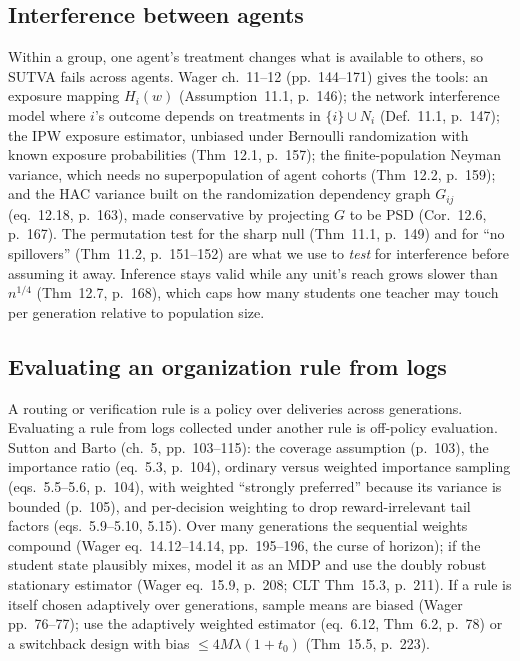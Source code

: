 \documentclass[11pt]{article}
\begin{document}
\subsection{Interference between agents}

Within a group, one agent's treatment changes what is available to others, so SUTVA fails across agents. Wager
ch.~11--12 (pp.~144--171) gives the tools: an exposure mapping $H_i(w)$ (Assumption~11.1, p.~146); the network
interference model where $i$'s outcome depends on treatments in $\{i\}\cup N_i$ (Def.~11.1, p.~147); the IPW exposure
estimator, unbiased under Bernoulli randomization with known exposure probabilities (Thm~12.1, p.~157); the
finite-population Neyman variance, which needs no superpopulation of agent cohorts (Thm~12.2, p.~159); and the
HAC variance built on the randomization dependency graph $G_{ij}$ (eq.~12.18, p.~163), made conservative by
projecting $G$ to be PSD (Cor.~12.6, p.~167). The permutation test for the sharp null (Thm~11.1, p.~149) and for
``no spillovers'' (Thm~11.2, p.~151--152) are what we use to \emph{test} for interference before assuming it away.
Inference stays valid while any unit's reach grows slower than $n^{1/4}$ (Thm~12.7, p.~168), which caps how many
students one teacher may touch per generation relative to population size.

\subsection{Evaluating an organization rule from logs}

A routing or verification rule is a policy over deliveries across generations. Evaluating a rule from logs
collected under another rule is off-policy evaluation. Sutton and Barto (ch.~5, pp.~103--115): the coverage
assumption (p.~103), the importance ratio (eq.~5.3, p.~104), ordinary versus weighted importance sampling
(eqs.~5.5--5.6, p.~104), with weighted ``strongly preferred'' because its variance is bounded (p.~105), and
per-decision weighting to drop reward-irrelevant tail factors (eqs.~5.9--5.10, 5.15). Over many generations the
sequential weights compound (Wager eq.~14.12--14.14, pp.~195--196, the curse of horizon); if the student state
plausibly mixes, model it as an MDP and use the doubly robust stationary estimator (Wager eq.~15.9, p.~208; CLT
Thm~15.3, p.~211). If a rule is itself chosen adaptively over generations, sample means are biased (Wager
pp.~76--77); use the adaptively weighted estimator (eq.~6.12, Thm~6.2, p.~78) or a switchback design with bias
$\le 4M\lambda(1+t_0)$ (Thm~15.5, p.~223).
\end{document}
